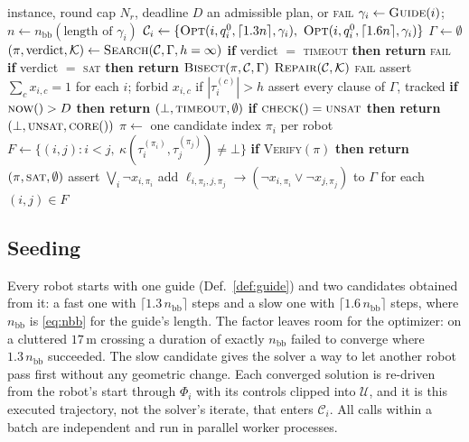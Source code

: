 \documentclass[conference]{IEEEtran}
\theoremstyle{plain}
\theoremstyle{definition}
\newcommand{\Rob}{\mathcal{R}}
\newcommand{\Cand}{\mathcal{C}}
\newcommand{\Uc}{\mathcal{U}}
\newcommand{\Core}{\mathcal{K}}
\begin{document}
\begin{algorithm}[t]
\caption{Core-guided coordination}
\label{alg:main}
\begin{algorithmic}[1]
\Require instance, round cap $N_r$, deadline $D$
\Ensure an admissible plan, or \textsc{fail}
\For{$i \in \Rob$}
  \State $\gamma_i \gets \textsc{Guide}(i)$;\quad $n \gets n_{\text{bb}}(\text{length of } \gamma_i)$
  \State $\Cand_i \gets \{\textsc{Opt}(i, q_i^0, \lceil 1.3n \rceil, \gamma_i),\
                          \textsc{Opt}(i, q_i^0, \lceil 1.6n \rceil, \gamma_i)\}$
\EndFor
\State $\Gamma \gets \emptyset$ 
\For{$r = 1 \dots N_r$}
  \State $(\pi, \text{verdict}, \Core) \gets \textsc{Search}(\Cand, \Gamma, h=\infty)$
  \State \textbf{if} verdict $=$ \textsc{timeout} \textbf{then return} \textsc{fail}
  \State \textbf{if} verdict $=$ \textsc{sat} \textbf{then return} $\textsc{Bisect}(\pi, \Cand, \Gamma)$
  \State $\textsc{Repair}(\Cand, \Core)$ \Comment{Alg.~\ref{alg:repair}}
\EndFor
\State \Return \textsc{fail}
\Statex
\Function{Search}{$\Cand, \Gamma, h$}
  \State assert $\sum_{c} x_{i,c} = 1$ for each $i$; forbid $x_{i,c}$ if $|\tau_i^{(c)}| > h$
  \State assert every clause of $\Gamma$, tracked
    \State \textbf{if} $\textsc{now}() > D$ \textbf{then return} $(\bot, \textsc{timeout}, \emptyset)$
    \State \textbf{if} $\textsc{check}() = \textsc{unsat}$ \textbf{then return} $(\bot, \textsc{unsat}, \textsc{core}())$
    \State $\pi \gets$ one candidate index $\pi_i$ per robot
    \State $F \gets \{(i,j) : i<j,\ \kappa(\tau_i^{(\pi_i)}, \tau_j^{(\pi_j)}) \neq \bot\}$
    \If{$F = \emptyset$}
      \State \textbf{if} \textsc{Verify}$(\pi)$ \textbf{then return} $(\pi,\textsc{sat},\emptyset)$
      \State assert $\bigvee_i \neg x_{i,\pi_i}$ \Comment{untracked}
    \Else
      \State add $\ell_{i,\pi_i,j,\pi_j} \rightarrow (\neg x_{i,\pi_i} \vee \neg x_{j,\pi_j})$
             to $\Gamma$ for each $(i,j) \in F$
    \EndIf
  \EndWhile
\EndFunction
\end{algorithmic}
\end{algorithm}

\subsection{Seeding}
\label{sec:seeding}

Every robot starts with one guide (Def.~\ref{def:guide}) and two candidates obtained from
it: a fast one with $\lceil 1.3\, n_{\text{bb}} \rceil$ steps and a slow one with
$\lceil 1.6\, n_{\text{bb}} \rceil$ steps, where $n_{\text{bb}}$ is \eqref{eq:nbb} for the
guide's length. The factor leaves room for the optimizer: on a cluttered $17$\,m crossing a
duration of exactly $n_{\text{bb}}$ failed to converge where $1.3\,n_{\text{bb}}$ succeeded. The slow candidate gives the solver a way to let another robot pass first without
any geometric change. Each converged solution is re-driven from the robot's start through
$\Phi_i$ with its controls clipped into $\Uc$, and it is this executed trajectory, not the
solver's iterate, that enters $\Cand_i$. All calls within a batch are independent and run in
parallel worker processes.
\end{document}

